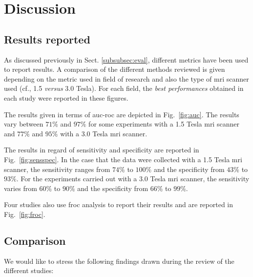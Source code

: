 \section{Discussion} \label{sec:discussion}

\subsection{Results reported}

As discussed previously in Sect. \ref{subsubsec:eval}, different metrics have been used to report results. A comparison of the different methods reviewed is given depending on the metric used in field of research and also the type of \ac{mri} scanner used (cf., 1.5 \textit{versus} 3.0 Tesla). For each field, the \textit{best performances} obtained in each study were reported in these figures.

The results given in terms of \ac{auc}-\ac{roc} are depicted in Fig.~\ref{fig:auc}. The results vary between $71\%$ and $97\%$ for some experiments with a 1.5 Tesla \ac{mri} scanner and $77\%$ and $95\%$ with a 3.0 Tesla \ac{mri} scanner. 

The results in regard of sensitivity and specificity are reported in Fig.~\ref{fig:sensspec}. In the case that the data were collected with a 1.5 Tesla \ac{mri} scanner, the sensitivity ranges from $74\%$ to $100\%$ and the specificity from $43\%$ to $93\%$. For the experiments carried out with a 3.0 Tesla \ac{mri} scanner, the sensitivity varies from $60\%$ to $90\%$ and the specificity from $66\%$ to $99\%$.

Four studies also use \ac{froc} analysis to report their results and are reported in Fig.~\ref{fig:froc}.

\subsection{Comparison}

We would like to stress the following findings drawn during the review of the different studies:

